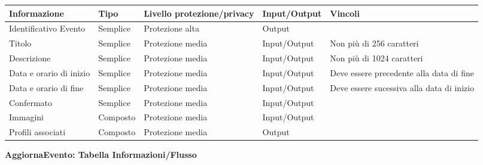 \begin{tabular} {|P{3cm}|P{3cm}|P{3cm}|P{3cm}|P{3cm}|}
    \hline
    \textbf{Informazione}   & \textbf{Tipo} & \textbf{Livello protezione/privacy} & \textbf{Input/Output} & \textbf{Vincoli}                          \\
    \hline
    Identificativo Evento   & Semplice      & Protezione alta                     & Output                &                                           \\
    \hline
    Titolo                  & Semplice      & Protezione media                    & Input/Output          & Non più di 256 caratteri                  \\
    \hline
    Descrizione             & Semplice      & Protezione media                    & Input/Output          & Non più di 1024 caratteri                 \\
    \hline
    Data e orario di inizio & Semplice      & Protezione media                    & Input/Output          & Deve essere precedente alla data di fine  \\
    \hline
    Data e orario di fine   & Semplice      & Protezione media                    & Input/Output          & Deve essere sucessiva alla data di inizio \\
    \hline
    Confermato              & Semplice      & Protezione media                    & Input/Output          &                                           \\
    \hline
    Immagini                & Composto      & Protezione media                    & Input/Output          &                                           \\
    \hline
    Profili associati       & Composto      & Protezione media                    & Output                &                                           \\
    \hline
\end{tabular}
\hfill \break

\textbf{AggiornaEvento: Tabella Informazioni/Flusso}
\hfill \break

